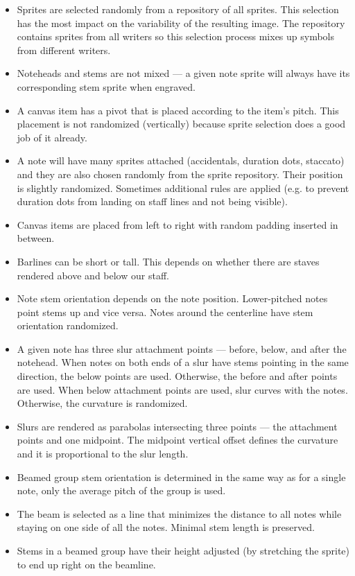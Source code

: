 \begin{itemize}
    \item Sprites are selected randomly from a repository of all sprites. This selection has the most impact on the variability of the resulting image. The repository contains sprites from all writers so this selection process mixes up symbols from different writers.
    \item Noteheads and stems are not mixed --- a given note sprite will always have its corresponding stem sprite when engraved.
    \item A canvas item has a pivot that is placed according to the item's pitch. This placement is not randomized (vertically) because sprite selection does a good job of it already.
    \item A note will have many sprites attached (accidentals, duration dots, staccato) and they are also chosen randomly from the sprite repository. Their position is slightly randomized. Sometimes additional rules are applied (e.g. to prevent duration dots from landing on staff lines and not being visible).
    \item Canvas items are placed from left to right with random padding inserted in between.
    \item Barlines can be short or tall. This depends on whether there are staves rendered above and below our staff.
    \item Note stem orientation depends on the note position. Lower-pitched notes point stems up and vice versa. Notes around the centerline have stem orientation randomized.
    \item A given note has three slur attachment points --- before, below, and after the notehead. When notes on both ends of a slur have stems pointing in the same direction, the below points are used. Otherwise, the before and after points are used. When below attachment points are used, slur curves with the notes. Otherwise, the curvature is randomized.
    \item Slurs are rendered as parabolas intersecting three points --- the attachment points and one midpoint. The midpoint vertical offset defines the curvature and it is proportional to the slur length.
    \item Beamed group stem orientation is determined in the same way as for a single note, only the average pitch of the group is used.
    \item The beam is selected as a line that minimizes the distance to all notes while staying on one side of all the notes. Minimal stem length is preserved.
    \item Stems in a beamed group have their height adjusted (by stretching the sprite) to end up right on the beamline.
\end{itemize}



